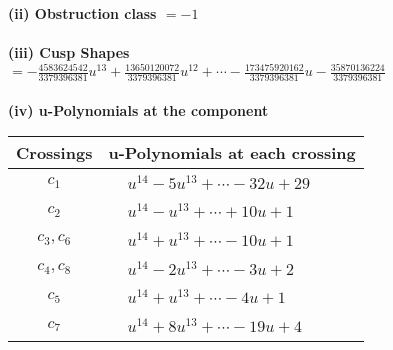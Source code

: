 \documentclass[1p]{elsarticle_modified}
\theoremstyle{definition}
\begin{document}
\flushleft \textbf{(ii) Obstruction class $= -1$}\\~\\
\flushleft \textbf{(iii) Cusp Shapes $= -\frac{4583624542}{3379396381} u^{13}+\frac{13650120072}{3379396381} u^{12}+\cdots-\frac{173475920162}{3379396381} u-\frac{35870136224}{3379396381}$}\\~\\
\newpage\renewcommand{\arraystretch}{1}
\flushleft \textbf{(iv) u-Polynomials at the component}\newline \\
\begin{tabular}{m{50pt}|m{274pt}}
Crossings & \hspace{64pt}u-Polynomials at each crossing \\
\hline $$\begin{aligned}c_{1}\end{aligned}$$&$\begin{aligned}
&u^{14}-5 u^{13}+\cdots-32 u+29
\end{aligned}$\\
\hline $$\begin{aligned}c_{2}\end{aligned}$$&$\begin{aligned}
&u^{14}- u^{13}+\cdots+10 u+1
\end{aligned}$\\
\hline $$\begin{aligned}c_{3},c_{6}\end{aligned}$$&$\begin{aligned}
&u^{14}+u^{13}+\cdots-10 u+1
\end{aligned}$\\
\hline $$\begin{aligned}c_{4},c_{8}\end{aligned}$$&$\begin{aligned}
&u^{14}-2 u^{13}+\cdots-3 u+2
\end{aligned}$\\
\hline $$\begin{aligned}c_{5}\end{aligned}$$&$\begin{aligned}
&u^{14}+u^{13}+\cdots-4 u+1
\end{aligned}$\\
\hline $$\begin{aligned}c_{7}\end{aligned}$$&$\begin{aligned}
&u^{14}+8 u^{13}+\cdots-19 u+4
\end{aligned}$\\

\end{tabular}
\end{document}
